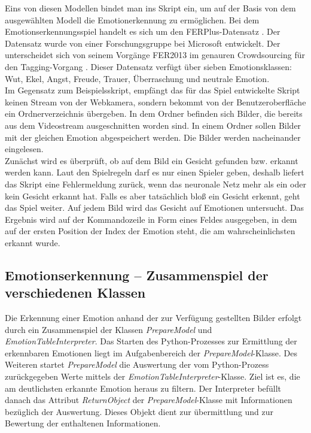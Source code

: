 \documentclass[12pt,a4paper,headinclude,twoside, plainheadsepline, open=right,numbers=noenddot]{scrreprt}
\begin{document}
Eins von diesen Modellen bindet man ins Skript ein, um auf der Basis von dem ausgewählten Modell die Emotionerkennung zu ermöglichen. Bei dem Emotionserkennungsspiel handelt es sich um den FERPlus-Datensatz \cite{LeweOhlsen}. Der Datensatz wurde von einer Forschungsgruppe bei Microsoft entwickelt. Der unterscheidet sich von seinem Vorgänge FER2013 im genauren Crowdsourcing für den Tagging-Vorgang \cite{RamakrishnanPandeyKarmakarSaha}. Dieser Datensatz verfügt über sieben Emotionsklassen: Wut, Ekel, Angst, Freude, Trauer, Überraschung und neutrale Emotion.\\
Im Gegensatz zum Beispielsskript, empfängt das für das Spiel entwickelte Skript keinen Stream von der Webkamera, sondern bekommt von der Benutzeroberfläche ein Ordnerverzeichnis übergeben. In dem Ordner befinden sich Bilder, die bereits aus dem Videostream ausgeschnitten worden sind. In einem Ordner sollen Bilder mit der gleichen Emotion abgespeichert werden. Die Bilder werden nacheinander eingelesen. \\
Zunächst wird es überprüft, ob auf dem Bild ein Gesicht gefunden bzw. erkannt werden kann. Laut den Spielregeln darf es nur einen Spieler geben, deshalb liefert das Skript eine Fehlermeldung zurück, wenn das neuronale Netz mehr als ein oder kein Gesicht erkannt hat. Falls es aber tatsächlich bloß ein Gesicht erkennt, geht das Spiel weiter. Auf jedem Bild wird das Gesicht auf Emotionen untersucht. Das Ergebnis wird auf der Kommandozeile in Form eines Feldes ausgegeben, in dem auf der ersten Position der Index der Emotion steht, die am wahrscheinlichsten erkannt wurde.

\subsection{Emotionserkennung – Zusammenspiel der verschiedenen Klassen}
Die Erkennung einer Emotion anhand der zur Verf\"{u}gung gestellten Bilder erfolgt durch ein Zusammenspiel der Klassen \textit{PrepareModel} und \textit{EmotionTableInterpreter}. Das Starten des Python-Prozesses zur Ermittlung der erkennbaren Emotionen liegt im Aufgabenbereich der \textit{PrepareModel}-Klasse. Des Weiteren startet \textit{PrepareModel} die Auswertung der vom Python-Prozess zur\"{u}ckgegeben Werte mittels der \textit{EmotionTableInterpreter}-Klasse. Ziel ist es, die am deutlichsten erkannte Emotion heraus zu filtern. Der Interpreter bef\"{u}llt danach das Attribut \textit{ReturnObject} der \textit{PrepareModel}-Klasse mit Informationen bez\"{u}glich der Auswertung. Dieses Objekt dient zur \"{u}bermittlung und zur Bewertung der enthaltenen Informationen.
\end{document}
